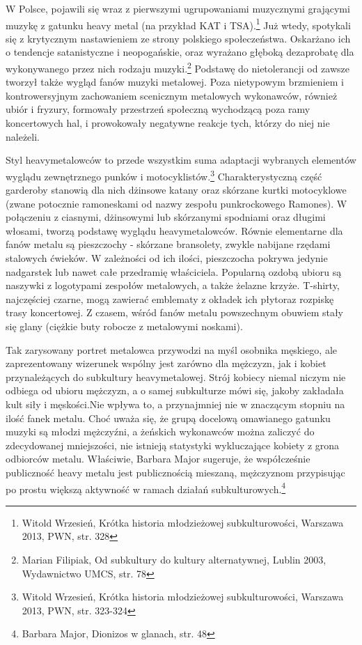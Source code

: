 \documentclass[12pt, a4paper, titlepage]{report}
\begin{document}
W Polsce, pojawili się wraz z pierwszymi ugrupowaniami muzycznymi grającymi muzykę z gatunku heavy metal (na przykład KAT i TSA).\footnote{Witold Wrzesień, Krótka historia młodzieżowej subkulturowości, Warszawa 2013, PWN, str. 328} Już wtedy, spotykali się z krytycznym nastawieniem ze strony polskiego społeczeństwa. Oskarżano ich o tendencje satanistyczne i neopogańskie, oraz wyrażano głęboką dezaprobatę dla wykonywanego przez nich rodzaju muzyki.\footnote{Marian Filipiak, Od subkultury do kultury alternatywnej, Lublin 2003, Wydawnictwo UMCS, str. 78} %
Podstawę do nietolerancji od zawsze tworzył także wygląd fanów muzyki metalowej. Poza nietypowym brzmieniem i kontrowersyjnym zachowaniem scenicznym metalowych wykonawców, również ubiór i fryzury, formowały przestrzeń społeczną wychodzącą poza ramy koncertowych hal, i prowokowały negatywne reakcje tych, którzy do niej nie należeli. 
 
Styl heavymetalowców to przede wszystkim suma adaptacji wybranych elementów wyglądu zewnętrznego punków i motocyklistów.\footnote{Witold Wrzesień, Krótka historia młodzieżowej subkulturowości, Warszawa 2013, PWN, \break str. 323-324} Charakterystyczną \break część garderoby stanowią dla nich dżinsowe katany oraz skórzane kurtki motocyklowe (zwane potocznie ramoneskami od nazwy zespołu punkrockowego Ramones). W połączeniu z ciasnymi, dżinsowymi lub skórzanymi spodniami oraz długimi włosami, tworzą podstawę wyglądu heavymetalowców. Równie elementarne dla fanów metalu są pieszczochy - skórzane bransolety, zwykle nabijane rzędami stalowych ćwieków. W zależności od ich ilości, pieszczocha pokrywa jedynie nadgarstek lub nawet całe przedramię właściciela. Popularną ozdobą ubioru są naszywki z logotypami zespołów metalowych, a także żelazne krzyże. T-shirty, najczęściej czarne, mogą zawierać emblematy z okładek ich płyt\footnotemark[\value{footnote}] oraz rozpiskę trasy koncertowej. %
Z czasem, wśród fanów metalu powszechnym obuwiem stały się glany (ciężkie buty robocze z metalowymi noskami). 

Tak zarysowany portret metalowca przywodzi na myśl osobnika męskiego,  ale zaprezentowany wizerunek wspólny jest zarówno dla mężczyzn, jak i kobiet przynależących do subkultury heavymetalowej. Strój kobiecy niemal niczym nie odbiega od ubioru mężczyzn, a o samej subkulturze mówi się, jakoby zakładała kult siły i męskości.\footnotemark[\value{footnote}] Nie wpływa to, a przynajmniej nie w znaczącym stopniu na ilość fanek metalu. Choć uważa się, że grupą docelową omawianego gatunku muzyki są młodzi mężczyźni, a żeńskich wykonawców można zaliczyć do zdecydowanej mniejszości, nie istnieją statystyki wykluczające kobiety z grona odbiorców metalu. Właściwie, Barbara Major sugeruje, że współcześnie publiczność heavy metalu jest publicznością mieszaną, mężczyznom przypisując po prostu większą aktywność w ramach działań subkulturowych.\footnote{Barbara Major, Dionizos w glanach, str. 48} 
\end{document}
